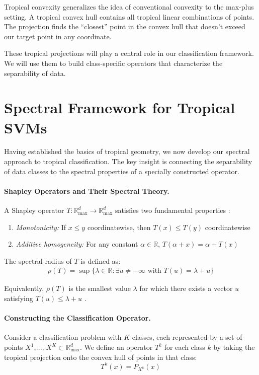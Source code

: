 \documentclass{article}
\newcommand{\R}{\mathbb{R}}
\newcommand{\Rmax}{\mathbb{R}_{\max}}
\begin{document}
Tropical convexity generalizes the idea of conventional convexity to the max-plus setting. A tropical convex hull contains all tropical linear combinations of points. The projection finds the ``closest'' point in the convex hull that doesn't exceed our target point in any coordinate.

These tropical projections will play a central role in our classification framework. We will use them to build class-specific operators that characterize the separability of data.

\section{Spectral Framework for Tropical SVMs}\label{sec:spectral}

Having established the basics of tropical geometry, we now develop our spectral approach to tropical classification. The key insight is connecting the separability of data classes to the spectral properties of a specially constructed operator.

\paragraph{Shapley Operators and Their Spectral Theory.}
A Shapley operator $T: \Rmax^d \to \Rmax^d$ satisfies two fundamental properties \cite{kolokoltsov1992}:
\begin{enumerate}
    \item \textit{Monotonicity:} If $x \leq y$ coordinatewise, then $T(x) \leq T(y)$ coordinatewise
    \item \textit{Additive homogeneity:} For any constant $\alpha \in \R$, $T(\alpha + x) = \alpha + T(x)$
\end{enumerate}

The spectral radius of $T$ is defined as:
\begin{align}
\rho(T) = \sup\{\lambda \in \R : \exists u \neq -\infty \text{ with } T(u) = \lambda + u\}
\end{align}

Equivalently, $\rho(T)$ is the smallest value $\lambda$ for which there exists a vector $u$ satisfying $T(u) \leq \lambda + u$ \cite{nussbaum1986}.

\paragraph{Constructing the Classification Operator.}
Consider a classification problem with $K$ classes, each represented by a set of points $X^1,\dots,X^K \subset \Rmax^d$. We define an operator $T^k$ for each class $k$ by taking the tropical projection onto the convex hull of points in that class:
\[
T^k(x) = P_{X^k}(x)
\]
\end{document}
